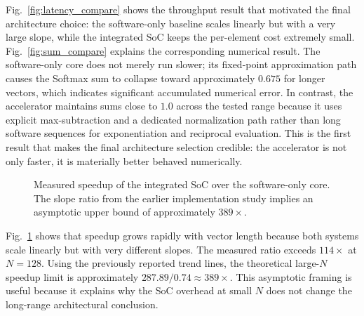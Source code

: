 \documentclass[conference]{IEEEtran}
\begin{document}
Fig.~\ref{fig:latency_compare} shows the throughput result that motivated the final architecture choice: the software-only baseline scales linearly but with a very large slope, while the integrated SoC keeps the per-element cost extremely small. Fig.~\ref{fig:sum_compare} explains the corresponding numerical result. The software-only core does not merely run slower; its fixed-point approximation path causes the Softmax sum to collapse toward approximately $0.675$ for longer vectors, which indicates significant accumulated numerical error. In contrast, the accelerator maintains sums close to $1.0$ across the tested range because it uses explicit max-subtraction and a dedicated normalization path rather than long software sequences for exponentiation and reciprocal evaluation. This is the first result that makes the final architecture selection credible: the accelerator is not only faster, it is materially better behaved numerically.

\begin{figure}[!t]
\centering
{}
\caption{Measured speedup of the integrated SoC over the software-only core. The slope ratio from the earlier implementation study implies an asymptotic upper bound of approximately $389\times$.}
\label{fig:speedup_compare}
\end{figure}

Fig.~\ref{fig:speedup_compare} shows that speedup grows rapidly with vector length because both systems scale linearly but with very different slopes. The measured ratio exceeds $114\times$ at $N=128$. Using the previously reported trend lines, the theoretical large-$N$ speedup limit is approximately $287.89 / 0.74 \approx 389\times$. This asymptotic framing is useful because it explains why the SoC overhead at small $N$ does not change the long-range architectural conclusion.
\end{document}
